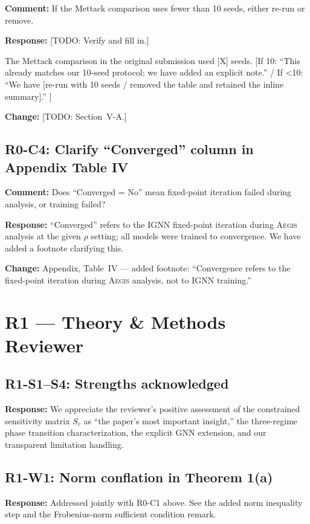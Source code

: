 \documentclass[11pt]{article}
\newcommand{\reviewer}[1]{\subsection*{\textcolor{revcolor}{#1}}}
\newcommand{\comment}[1]{\textcolor{revcolor}{\textbf{Comment:} #1}}
\newcommand{\response}[1]{\textcolor{responsecolor}{\textbf{Response:} #1}}
\newcommand{\change}[1]{\textcolor{changecolor}{\textbf{Change:} #1}}
\newcommand{\AEGIS}{\textsc{Aegis}}
\begin{document}
\comment{If the Mettack comparison uses fewer than 10 seeds, either re-run or remove.}

\response{
[TODO: Verify and fill in.]

The Mettack comparison in the original submission used [X] seeds. [If 10: ``This already matches our 10-seed protocol; we have added an explicit note.'' / If <10: ``We have [re-run with 10 seeds / removed the table and retained the inline summary].'' ]
}

\change{[TODO: Section~V-A.]}


\reviewer{R0-C4: Clarify ``Converged'' column in Appendix Table IV}

\comment{Does ``Converged = No'' mean fixed-point iteration failed during analysis, or training failed?}

\response{
``Converged'' refers to the IGNN fixed-point iteration during \AEGIS{} analysis at the given $\rho$ setting; all models were trained to convergence. We have added a footnote clarifying this.
}

\change{Appendix, Table~IV --- added footnote: ``Convergence refers to the fixed-point iteration during \AEGIS{} analysis, not to IGNN training.''}

\section*{R1 — Theory \& Methods Reviewer}

\reviewer{R1-S1--S4: Strengths acknowledged}

\response{We appreciate the reviewer's positive assessment of the constrained sensitivity matrix $S_c$ as ``the paper's most important insight,'' the three-regime phase transition characterization, the explicit GNN extension, and our transparent limitation handling.}


\reviewer{R1-W1: Norm conflation in Theorem 1(a)}

\response{Addressed jointly with R0-C1 above. See the added norm inequality step and the Frobenius-norm sufficient condition remark.}

\end{document}
